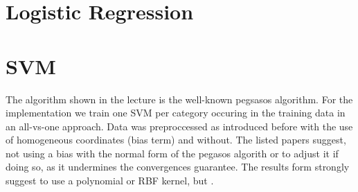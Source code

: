 \documentclass{article}
\begin{document}
\section*{Logistic Regression}
\lipsum[1-4] %

\section*{SVM}
The algorithm shown in the lecture is the well-known pegsasos algorithm\cite{shalev-shwartz_pegasos:_2011,shalev-shwartz_pegasos:_????}. For the implementation we train one SVM per category occuring in the training data in an all-vs-one approach.
Data was preproccessed as introduced before with the use of homogeneous coordinates (bias term) and without. The listed papers suggest, not using a bias with the normal form of the pegasos algorith or to adjust it if doing so, as it undermines the convergences guarantee. 
The results form \cite{joachims_text_1998} strongly suggest to use a polynomial or RBF kernel, but .


\printbibliography
\end{document}
